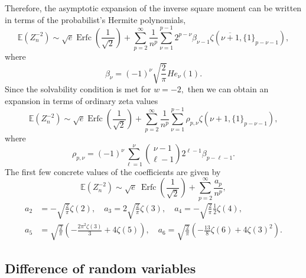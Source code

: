 \documentclass[10pt,reqno,a4paper]{amsart}%
\theoremstyle{definition}
\DeclareMathOperator{\Erfc}{Erfc} %
\newcommand{\E}{\ensuremath{\mathbb{E}}} %
\begin{document}
Therefore, the asymptotic expansion of the inverse square moment can be
written in terms of the probabilist's Hermite polynomials,
\begin{equation}
\E(Z_{n}^{-2})\sim\sqrt{e}\Erfc\left(  \frac{1}{\sqrt{2}%
}\right)  +\sum_{p=2}^{\infty}\frac{1}{n^{p}}\sum_{\nu=1}^{p-1}2^{p-\nu}%
\beta_{\nu-1}\zeta(\overline{\nu+1},\{1\}_{p-\nu-1}),
\end{equation}
where
\[
\beta_{\nu}=(-1)^{\nu}\sqrt{\frac{2}{\pi}}He_{\nu}(1).
\]
Since the solvability condition is met for $w=-2,$ then we can obtain an
expansion in terms of ordinary zeta values%
\[
\E(Z_{n}^{-2})\sim\sqrt{e}\Erfc\left(  \frac{1}{\sqrt{2}%
}\right)  +\sum_{p=2}^{\infty}\frac{1}{n^{p}}\sum_{\nu=1}^{p-1}\rho_{p,\nu
}\zeta(\nu+1,\{1\}_{p-\nu-1}),
\]
where%
\[
\rho_{p,\nu}=\left(  -1\right)  ^{\nu}\sum_{\ell=1}^{\nu}\binom{\nu-1}{\ell
-1}2^{\ell-1}\beta_{p-\ell-1}.
\]
The first few concrete values of the coefficients are given by%
\[
\E(Z_{n}^{-2})\sim \sqrt{e}\ \Erfc\left(  \frac{1}{\sqrt{2}}\right)+\sum_{p=2}^{\infty}\frac{a_{p}}{n^{p}},
\]%
\begin{align*}
a_{2}&=-\sqrt{\frac{2}{\pi}}\zeta\left(  2\right)  ,\quad
a_{3}=2\sqrt{\frac{2}{\pi}}\zeta(3),\quad a_{4}=-\sqrt{\frac{2}{\pi}}\frac
{1}{2}\zeta(4),\\
a_{5}  &  =\sqrt{\frac{2}{\pi}}\left(  -\frac{2\pi^{2}\zeta(3)}{3}%
+4\zeta(5)\right)  ,\quad a_{6}=\sqrt{\frac{2}{\pi}}\left(  -\frac{13}{8}%
\zeta(6)+4\zeta(3)^{2}\right)  .
\end{align*}


\subsection{Difference of random variables}
\end{document}
